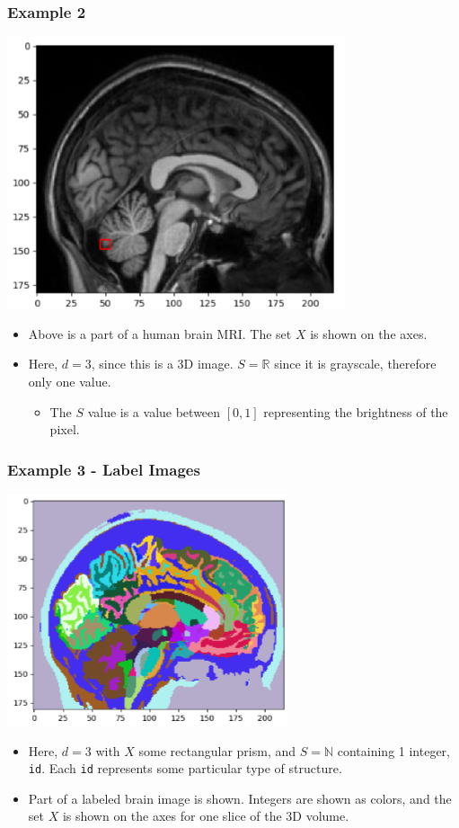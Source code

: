 \documentclass[10pt]{article}
\newcommand{\R}{\mathbb{R}}
\begin{document}
\subsubsection*{Example 2}
\begin{center}
    \includegraphics[scale=1]{W1_2.png}
\end{center}
\begin{itemize}
    \item Above is a part of a human brain MRI.  The set $X$ is shown on the axes.
    \item Here, $d = 3$, since this is a 3D image.  $S = \R$ since it is grayscale, therefore only one value.
    \begin{itemize}
        \item The $S$ value is a value between $[0, 1]$ representing the brightness of the pixel.
    \end{itemize}
\end{itemize}

\subsubsection*{Example 3 - Label Images}
\begin{center}
    \includegraphics[scale=1]{W1_3.png}
\end{center}
\begin{itemize}
    \item Here, $d = 3$ with $X$ some rectangular prism, and $S = \mathbb{N}$ containing 1 integer, \texttt{id}.  Each \texttt{id} represents some particular type of structure.  
    \item Part of a labeled brain image is shown.  Integers are shown as colors, and the set $X$ is shown on the axes for one slice of the 3D volume.
\end{itemize}
\end{document}
